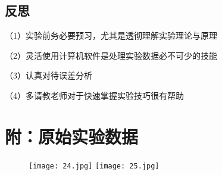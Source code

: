 \documentclass[11pt,a4paper]{article}
\begin{document}
    \subsection{反思}
    （1）实验前务必要预习，尤其是透彻理解实验理论与原理\par
    （2）灵活使用计算机软件是处理实验数据必不可少的技能\par
    （3）认真对待误差分析\par
    （4）多请教老师对于快速掌握实验技巧很有帮助\par

    \section*{附：原始实验数据}
    \begin{figure}[H]
        \centering
        \texttt{[image: 24.jpg]}
        \texttt{[image: 25.jpg]}
    \end{figure}
\end{document}
